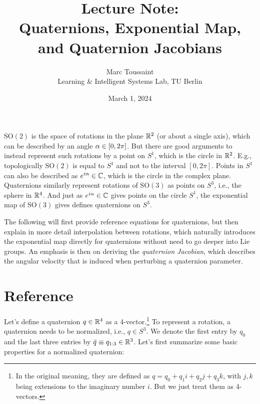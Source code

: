 
\note

\title{Lecture Note:\\ Quaternions, Exponential Map, and Quaternion Jacobians}
\author{Marc Toussaint\\\small Learning \& Intelligent Systems Lab, TU Berlin}
\date{March 1, 2024}

\renewcommand{\t}{\theta}
\renewcommand{\hat}{\widehat}
\newcommand{\bbg}{{\bar{\bar g}}}
\newcommand{\ul}{\widehat}
\newcommand{\bd}{\boldsymbol}
\newcommand{\SE}{\text{SE}}
\newcommand{\SO}{\text{SO}}
\newcommand{\nor}{\text{normalize}}
\renewcommand{\skew}{\text{skew}}

\notetitle


$\SO(2)$ is the space of rotations in the plane ${\mathbb{R}}^2$ (or about a
single axis), which can be
described by an angle $\alpha\in[0,2\pi]$. But there are good arguments to
instead represent such rotations by a point on $S^1$, which is the
circle in ${\mathbb{R}}^2$. E.g., topologically $\SO(2)$ is equal to $S^1$
and not to the interval $[0,2\pi]$. Points in $S^1$ can also be described as
$e^{i\alpha} \in{\mathbb{C}}$, which is the circle in the complex
plane. Quaternions similarly represent rotations of $\SO(3)$ as points
on $S^3$, i.e., the sphere in ${\mathbb{R}}^4$. And just as $e^{i\alpha} \in{\mathbb{C}}$
gives points on the circle $S^1$, the exponential map of $\SO(3)$
gives defines quaternions on $S^3$.

The following will first provide reference equations for quaternions,
but then explain in more detail interpolation between rotations, which
naturally introduces the exponential map directly for quaternions
without need to go deeper into Lie groups. An emphasis is then on
deriving the \emph{quaternion Jacobian}, which describes the
angular velocity that is induced when perturbing a
quaternion parameter.


\section{Reference}

Let's define a quaternion $q\in{\mathbb{R}}^4$ as a 4-vector.\footnote{In the
original meaning, they are defined as $q = q_0 + q_1 i + q_2 j + q_3
k$, with $j,k$ being extensions to the imaginary number $i$. But we
just treat them as 4-vectors.} To represent a rotation, a quaternion
needs to be normalized, i.e., $q\in S^3$. We denote the first entry by
$q_0$ and the last three
entries by $\bar q\equiv q_{1:3} \in{\mathbb{R}}^3$. Let's first summarize
some basic properties for a normalized quaternion:

